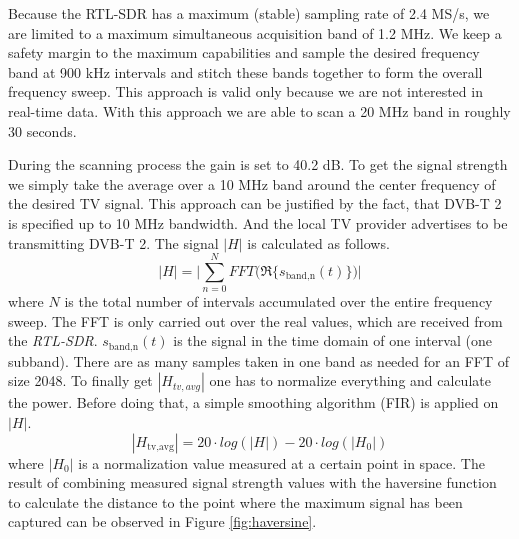 Because the RTL-SDR has a maximum (stable) sampling rate of 2.4 MS/s, we are
limited to a maximum simultaneous acquisition band of 1.2 MHz. We keep a safety
margin to the maximum capabilities and sample the desired frequency band at 900
kHz intervals and stitch these bands together to form the overall frequency
sweep. This approach is valid only because we are not interested in real-time
data.  With this approach we are able to scan a 20 MHz band in roughly 30
seconds.

During the scanning process the gain is set to 40.2 dB. To get the
signal strength we simply take the average over a 10 MHz band around the
center frequency of the desired TV signal. This approach can be
justified by the fact, that DVB-T 2 is specified up to 10 MHz bandwidth.
And the local TV provider advertises to be transmitting DVB-T 2.
The signal \ensuremath{|H|} is calculated as follows.  
\begin{equation}
	|H| = \Biggl| \sum_{n=0}^N FFT\biggl( \Re\{ s_{\text{band,n}}(t) \} \biggr) \Biggr|
\end{equation}     where \ensuremath{N} is the total number of intervals
accumulated over the entire frequency sweep. The FFT is only carried out over
the real values, which are received from the \textit{RTL-SDR}.
\ensuremath{s_{\text{band,n}}(t)} is the signal in the time domain of one
interval (one subband). There are as many samples taken in one band as needed
for an FFT of size 2048. To finally get \ensuremath{|H_{tv,avg}|} one has to
normalize everything and calculate the power. Before doing that, a simple
smoothing algorithm (FIR) is applied on \ensuremath{|H|}.  
\begin{equation}
	|H_{\text{tv,avg}}| = 20 \cdot log (|H|) - 20 \cdot log(|H_0|)
\end{equation}   
where \ensuremath{|H_0|} is a normalization value measured at a certain point
in space. The result of combining measured signal strength values with the
haversine function to calculate the distance to the point where the maximum
signal has been captured can be observed in Figure \ref{fig:haversine}.
